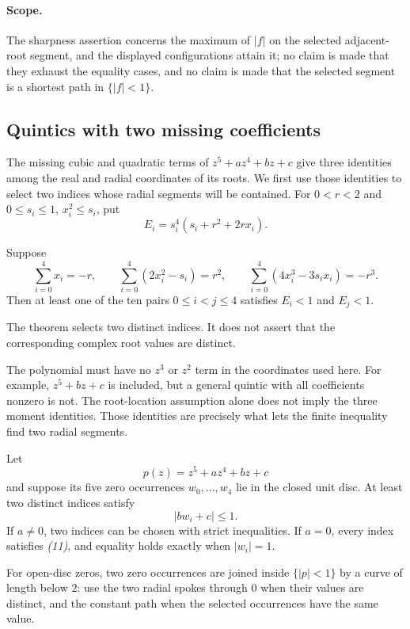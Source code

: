 \paragraph{Scope.}
\label{rem:sharp-collinear-formal-boundary}
The sharpness assertion concerns the maximum of $|f|$ on the selected adjacent-root
segment, and the displayed configurations attain it; no claim is made that
they exhaust the equality cases, and no claim is made that the selected
segment is a shortest path in $\{|f|<1\}$.

\subsection{Quintics with two missing coefficients}
\label{subsec:primitive-sparse-quintic}

The missing cubic and quadratic terms of $z^5+az^4+bz+c$ give three
identities among the real and radial coordinates of its roots. We first
use those identities to select two indices whose radial segments will
be contained. For $0<r<2$ and $0\le s_i\le1$, $x_i^2\le s_i$, put
\[
 E_i=s_i^4(s_i+r^2+2rx_i).
\]

\begin{theorem}
\label{prop:primitive-quintic-two-tail-energy-selector}
Suppose
\[
 \sum_{i=0}^4x_i=-r,\qquad
 \sum_{i=0}^4(2x_i^2-s_i)=r^2,\qquad
 \sum_{i=0}^4(4x_i^3-3s_ix_i)=-r^3.              \tag{10}
\]
Then at least one of the ten pairs $0\le i<j\le4$ satisfies
$E_i<1$ and $E_j<1$.
\end{theorem}

The theorem selects two distinct indices.  It does not assert that the
corresponding complex root values are distinct.

The polynomial must have no $z^3$ or $z^2$ term in the coordinates used
here. For example, $z^5+bz+c$ is included, but a general quintic with all
coefficients nonzero is not. The root-location assumption alone does not
imply the three moment identities. Those identities are precisely what
lets the finite inequality find two radial segments.

\begin{theorem}
\label{thm:primitive-quintic-two-tail}
Let
\[
 p(z)=z^5+az^4+bz+c
\]
and suppose its five zero occurrences $w_0,\ldots,w_4$ lie in the closed unit
disc.  At least two distinct indices satisfy
\[
 |bw_i+c|\le1.                                    \tag{11}
\]
If $a\ne0$, two indices can be chosen with strict inequalities.  If $a=0$,
every index satisfies \emph{(11)}, and equality holds exactly when
$|w_i|=1$.

For open-disc zeros, two zero occurrences are joined inside $\{|p|<1\}$ by a
curve of length below $2$: use the two radial spokes through $0$ when their
values are distinct, and the constant path when the selected occurrences
have the same value.
\end{theorem}

